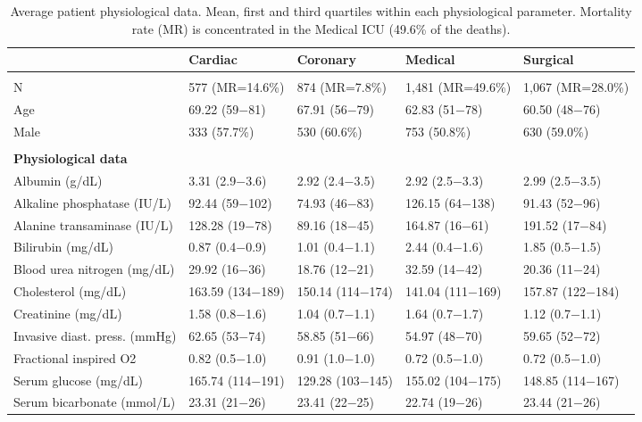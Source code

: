 \begin{table*} [ht!]
\caption{Average patient physiological data. Mean, first and third quartiles within each physiological parameter. Mortality rate (MR) is concentrated in the Medical ICU (49.6\% of the deaths).}
\centering
  \begin{tabular}{lllll} \hline
&Cardiac&Coronary&Medical&Surgical\\\hline\\
N     & 577 (MR=14.6\%)& 874 (MR=7.8\%)& 1,481 (MR=49.6\%)& 1,067 (MR=28.0\%)\\
Age   &69.22 (59$-$81)& 67.91 (56$-$79)& 62.83 (51$-$78)& 60.50 (48$-$76)\\

Male  & 333 (57.7\%)& 530 (60.6\%)& 753 (50.8\%)& 630 (59.0\%)\\
\hline\\
\multicolumn{5}{l}{\bf{Physiological data}}\\
Albumin (g/dL) & 3.31 (2.9$-$3.6) & 2.92 (2.4$-$3.5) & 2.92 (2.5$-$3.3) & 2.99 (2.5$-$3.5) \\
Alkaline phosphatase (IU/L) & 92.44 (59$-$102) & 74.93 (46$-$83) & 126.15 (64$-$138) & 91.43 (52$-$96) \\
Alanine transaminase (IU/L) & 128.28 (19$-$78) & 89.16 (18$-$45) & 164.87 (16$-$61) & 191.52 (17$-$84) \\
Bilirubin (mg/dL) & 0.87 (0.4$-$0.9) & 1.01 (0.4$-$1.1) & 2.44 (0.4$-$1.6) & 1.85 (0.5$-$1.5) \\
Blood urea nitrogen (mg/dL) & 29.92 (16$-$36) & 18.76 (12$-$21) & 32.59 (14$-$42) & 20.36 (11$-$24) \\
Cholesterol (mg/dL) & 163.59 (134$-$189) & 150.14 (114$-$174) & 141.04 (111$-$169) & 157.87 (122$-$184) \\
Creatinine (mg/dL) & 1.58 (0.8$-$1.6) & 1.04 (0.7$-$1.1) & 1.64 (0.7$-$1.7) & 1.12 (0.7$-$1.1) \\
Invasive diast. press. (mmHg) & 62.65 (53$-$74) & 58.85 (51$-$66) & 54.97 (48$-$70) & 59.65 (52$-$72) \\
Fractional inspired O2 & 0.82 (0.5$-$1.0) & 0.91 (1.0$-$1.0) & 0.72 (0.5$-$1.0) & 0.72 (0.5$-$1.0) \\
Serum glucose (mg/dL) & 165.74 (114$-$191) & 129.28 (103$-$145) & 155.02 (104$-$175) & 148.85 (114$-$167) \\
Serum bicarbonate (mmol/L) & 23.31 (21$-$26) & 23.41 (22$-$25) & 22.74 (19$-$26) & 23.44 (21$-$26) \\

\end{tabular}
\end{table*}
